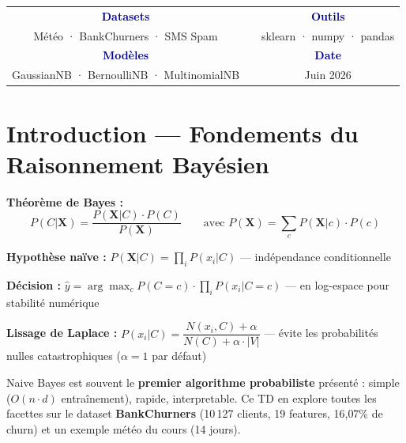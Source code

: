 \documentclass[12pt,a4paper]{article}
\begin{document}
\begin{titlepage}
\begin{center}
\begin{tcolorbox}[enhanced,width=0.88\textwidth,colback=white,colframe=darkblue,
    boxrule=2pt,arc=4pt,drop shadow={darkblue!40}]
  \end{tcolorbox}
\end{center}
\vfill
\begin{center}
\begin{tabular}{ccc}
  \textcolor{darkblue}{\textbf{Datasets}} & \quad & \textcolor{darkblue}{\textbf{Outils}} \\
  \textcolor{tealcolor}{Météo · BankChurners · SMS Spam} & & \textcolor{tealcolor}{sklearn · numpy · pandas} \\[1em]
  \textcolor{darkblue}{\textbf{Modèles}} & & \textcolor{darkblue}{\textbf{Date}} \\
  \textcolor{tealcolor}{GaussianNB · BernoulliNB · MultinomialNB} & & \textcolor{tealcolor}{Juin 2026}
\end{tabular}
\end{center}
\end{titlepage}

\tableofcontents\newpage

\section{Introduction — Fondements du Raisonnement Bayésien}

\begin{theorbox}
\textbf{Théorème de Bayes :}
$$P(C|\mathbf{X}) = \frac{P(\mathbf{X}|C) \cdot P(C)}{P(\mathbf{X})} \qquad
\text{avec } P(\mathbf{X}) = \sum_c P(\mathbf{X}|c) \cdot P(c)$$

\textbf{Hypothèse naïve :} $P(\mathbf{X}|C) = \prod_i P(x_i|C)$ — indépendance conditionnelle

\textbf{Décision :} $\hat{y} = \arg\max_c P(C=c) \cdot \prod_i P(x_i|C=c)$ — en log-espace pour stabilité numérique

\textbf{Lissage de Laplace :} $P(x_i|C) = \dfrac{N(x_i,C) + \alpha}{N(C) + \alpha \cdot |V|}$
— évite les probabilités nulles catastrophiques ($\alpha=1$ par défaut)
\end{theorbox}

Naive Bayes est souvent le \textbf{premier algorithme probabiliste} présenté : simple ($O(n \cdot d)$ entraînement), rapide, interpretable. Ce TD en explore toutes les facettes sur le dataset \textbf{BankChurners} (10\,127 clients, 19 features, 16{,}07\% de churn) et un exemple météo du cours (14 jours).

\end{document}
